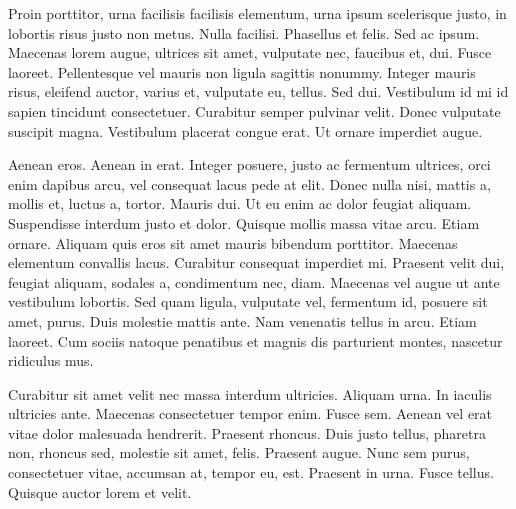 \documentclass[letterpaper,twocolumn]{article}
\begin{document}
Proin porttitor, urna facilisis facilisis elementum, urna ipsum
scelerisque justo, in lobortis risus justo non metus. Nulla
facilisi. Phasellus et felis. Sed ac ipsum. Maecenas lorem augue,
ultrices sit amet, vulputate nec, faucibus et, dui. Fusce
laoreet. Pellentesque vel mauris non ligula sagittis nonummy. Integer
mauris risus, eleifend auctor, varius et, vulputate eu, tellus. Sed
dui. Vestibulum id mi id sapien tincidunt consectetuer. Curabitur
semper pulvinar velit. Donec vulputate suscipit magna. Vestibulum
placerat congue erat. Ut ornare imperdiet augue.

Aenean eros. Aenean in erat. Integer posuere, justo ac fermentum
ultrices, orci enim dapibus arcu, vel consequat lacus pede at
elit. Donec nulla nisi, mattis a, mollis et, luctus a, tortor. Mauris
dui. Ut eu enim ac dolor feugiat aliquam. Suspendisse interdum justo
et dolor. Quisque mollis massa vitae arcu. Etiam ornare. Aliquam quis
eros sit amet mauris bibendum porttitor. Maecenas elementum convallis
lacus. Curabitur consequat imperdiet mi. Praesent velit dui, feugiat
aliquam, sodales a, condimentum nec, diam. Maecenas vel augue ut ante
vestibulum lobortis. Sed quam ligula, vulputate vel, fermentum id,
posuere sit amet, purus. Duis molestie mattis ante. Nam venenatis
tellus in arcu. Etiam laoreet. Cum sociis natoque penatibus et magnis
dis parturient montes, nascetur ridiculus mus.

Curabitur sit amet velit nec massa interdum ultricies. Aliquam
urna. In iaculis ultricies ante. Maecenas consectetuer tempor
enim. Fusce sem. Aenean vel erat vitae dolor malesuada
hendrerit. Praesent rhoncus. Duis justo tellus, pharetra non, rhoncus
sed, molestie sit amet, felis. Praesent augue. Nunc sem purus,
consectetuer vitae, accumsan at, tempor eu, est. Praesent in
urna. Fusce tellus. Quisque auctor lorem et velit.
\end{document}
